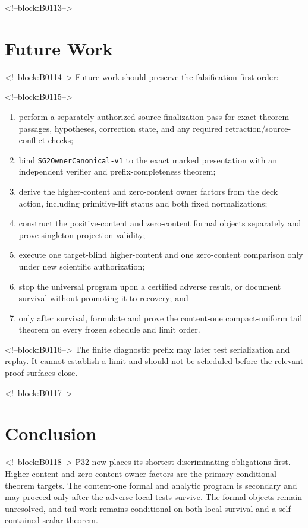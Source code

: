 \documentclass[11pt]{article}
\providecommand{\tightlist}{\setlength{\itemsep}{0pt}\setlength{\parskip}{0pt}}
\begin{document}
<!--block:B0113-->
\hypertarget{9-future-work}{%
\section{Future Work}\label{9-future-work}}

<!--block:B0114-->
Future work should preserve the falsification-first order:

<!--block:B0115-->
\begin{enumerate}
\def\labelenumi{\arabic{enumi}.}
\tightlist
\item
  perform a separately authorized source-finalization pass for exact
  theorem passages, hypotheses, correction state, and any required
  retraction/source-conflict checks;
\item
  bind \texttt{SG2OwnerCanonical-v1} to the exact marked presentation
  with an independent verifier and prefix-completeness theorem;
\item
  derive the higher-content and zero-content owner factors from the deck
  action, including primitive-lift status and both fixed normalizations;
\item
  construct the positive-content and zero-content formal objects
  separately and prove singleton projection validity;
\item
  execute one target-blind higher-content and one zero-content
  comparison only under new scientific authorization;
\item
  stop the universal program upon a certified adverse result, or
  document survival without promoting it to recovery; and
\item
  only after survival, formulate and prove the content-one
  compact-uniform tail theorem on every frozen schedule and limit order.
\end{enumerate}

<!--block:B0116-->
The finite diagnostic prefix may later test serialization and replay. It
cannot establish a limit and should not be scheduled before the relevant
proof surfaces close.

<!--block:B0117-->
\hypertarget{10-conclusion}{%
\section{Conclusion}\label{10-conclusion}}

<!--block:B0118-->
P32 now places its shortest discriminating obligations first.
Higher-content and zero-content owner factors are the primary
conditional theorem targets. The content-one formal and analytic program
is secondary and may proceed only after the adverse local tests survive.
The formal objects remain unresolved, and tail work remains conditional
on both local survival and a self-contained scalar theorem.
\end{document}
